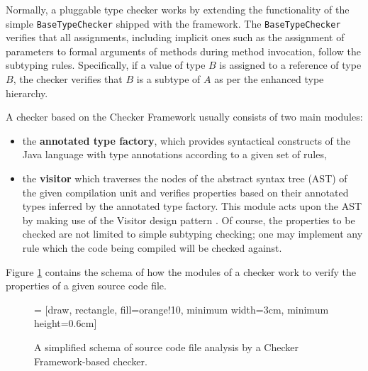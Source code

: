 \documentclass{pracamgr}
\begin{document}
Normally, a pluggable type checker works by extending the
functionality of the simple \texttt{BaseTypeChecker} shipped with the
framework. The \texttt{BaseTypeChecker} verifies that all assignments,
including implicit ones such as the assignment of parameters to formal
arguments of methods during method invocation, follow the subtyping
rules. Specifically, if a value of type $B$ is assigned to a reference
of type $B$, the checker verifies that $B$ is a subtype of $A$ as per
the enhanced type hierarchy.

A checker based on the Checker Framework usually consists of two main
modules:
\begin{itemize}
\item the \textbf{annotated type factory}, which provides syntactical
  constructs of the Java language with type annotations according to a
  given set of rules,
\item the \textbf{visitor} which traverses the nodes of the abstract
  syntax tree (AST) of the given compilation unit and verifies
  properties based on their annotated types inferred by the annotated
  type factory. This module acts upon the AST by making use of the
  Visitor design pattern \cite{visitor}. Of course, the properties to
  be checked are not limited to simple subtyping checking; one may
  implement any rule which the code being compiled will be checked
  against.
\end{itemize}
Figure \ref{fig:simple-checker} contains the schema of how the modules
of a checker work to verify the properties of a given source code
file.

\begin{figure}
  \centering

   = [draw, rectangle, fill=orange!10, minimum width=3cm, minimum height=0.6cm]

  \caption{A simplified schema of source code file analysis by a
    Checker Framework-based checker.}
  \label{fig:simple-checker}
\end{figure}
\end{document}
